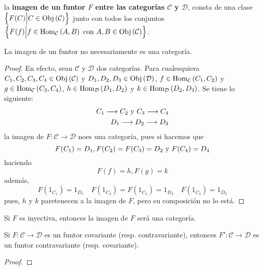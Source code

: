 \documentclass[12pt]{report}
\theoremstyle{largebreak}
\newcommand\cf[3]{\ensuremath{#1:#2\rightarrow#3}}
\newcommand{\Obj}[1]{\ensuremath{\textup{Obj}\left(#1\right)}}
\newcommand{\Hom}[3]{\ensuremath{\textup{Hom}_{#1}\left(#2,#3\right)}}
\begin{document}
    \begin{mydef}
        la \textbf{imagen de un funtor $F$ entre las categorías $\mathcal{C}$ y $\mathcal{D}$}, consta de una clase $\left\{F(C)\Big|C\in\Obj{\mathcal{C}} \right\}$ junto con todos los conjuntos $\left\{F(f)\Big|f\in\Hom{\mathcal{C}}{A}{B}\textup{ con }A,B\in\Obj{\mathcal{C}} \right\}$.
    \end{mydef}

    \begin{obs}
        La imagen de un funtor no necesariamente es una categoría.
    \end{obs}

    \begin{proof}
        En efecto, sean $\mathcal{C}$ y $\mathcal{D}$ dos categorías. Para cualesquiera $C_1,C_2,C_3,C_4\in\Obj{\mathcal{C}}$ y $D_1,D_2,D_3\in\Obj{\mathcal{D}}$, $f\in\Hom{\mathcal{C}}{C_1}{C_2}$ y $g\in\Hom{\mathcal{C}}{C_3}{C_4}$, $h\in\Hom{\mathcal{D}}{D_1}{D_2}$ y $k\in\Hom{\mathcal{D}}{D_2}{D_3}$. Se tiene lo siguiente:
        \begin{equation*}
            \begin{split}
                C_1\longrightarrow C_2\textup{ y }C_3\longrightarrow C_4\\
                D_1\longrightarrow D_2\longrightarrow D_3\\
            \end{split}
        \end{equation*}
        la imagen de $\cf{F}{\mathcal{C}}{\mathcal{D}}$ noes una categoría, pues si hacemos que
        \begin{equation*}
            F(C_1)=D_1, F(C_2)=F(C_3)=D_2\textup{ y }F(C_4)=D_4
        \end{equation*}
        haciendo
        \begin{equation*}
            F(f)=h,F(g)=k
        \end{equation*}
        además,
        \begin{equation*}
            F(1_{C_1})=1_{D_1}\quad F(1_{C_2})=F(1_{C_3})=1_{D_2}\quad F(1_{C_4})=1_{D_3} 
        \end{equation*}
        pues, $h$ y $k$ paretenecen a la imagen de $F$, pero su composición no lo está.
    \end{proof}

    \begin{obs}
        Si $F$ es inyectiva, entonces la imagen de $F$ será una categoría.
    \end{obs}

    \begin{propo}
        Si $\cf{F}{\mathcal{C}}{\mathcal{D}}$ es un funtor covariante (resp. contravariante), entonces $\cf{F'}{\mathcal{C}}{\mathcal{D}}$ es un funtor contravariante (resp. covariante).
    \end{propo}

    \begin{proof}
        
    \end{proof}
\end{document}
